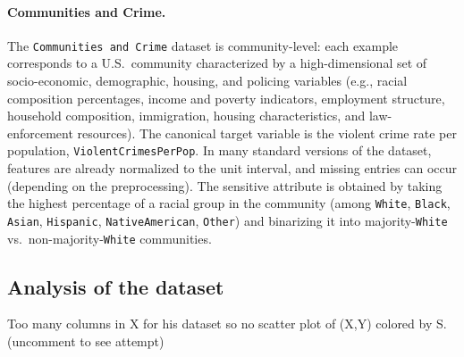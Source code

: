 \documentclass[11pt]{article}
\begin{document}
  \paragraph{Communities and Crime.}
The \texttt{Communities and Crime} dataset is community-level: each example corresponds to a U.S.\ community characterized by a high-dimensional set of socio-economic, demographic, housing, and policing variables (e.g., racial composition percentages, income and poverty indicators, employment structure, household composition, immigration, housing characteristics, and law-enforcement resources). 
The canonical target variable is the violent crime rate per population, \texttt{ViolentCrimesPerPop}. 
In many standard versions of the dataset, features are already normalized to the unit interval, and missing entries can occur (depending on the preprocessing). 
The sensitive attribute is obtained by taking the highest percentage of a racial group in the community (among \texttt{White}, \texttt{Black}, \texttt{Asian}, \texttt{Hispanic}, \texttt{NativeAmerican}, \texttt{Other}) and binarizing it into majority-\texttt{White} vs.\ non-majority-\texttt{White} communities.

  \subsection{Analysis of the dataset}

  Too many columns in X for his dataset so no scatter plot of (X,Y) colored by S. (uncomment to see attempt)
\end{document}
